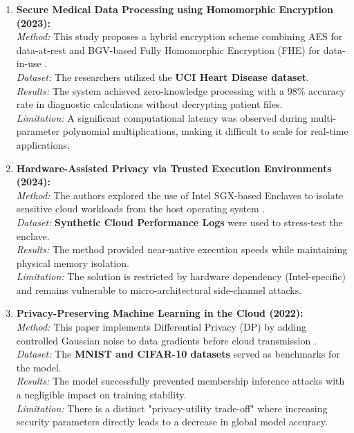 \documentclass[12pt, a4paper]{article}
\begin{document}
\begin{enumerate}
    \item \textbf{Secure Medical Data Processing using Homomorphic Encryption (2023):} \\
    \textit{Method:} This study proposes a hybrid encryption scheme combining AES for data-at-rest and BGV-based Fully Homomorphic Encryption (FHE) for data-in-use \cite{zhang2023cloudsecurity}. \\
    \textit{Dataset:} The researchers utilized the \textbf{UCI Heart Disease dataset}. \\
    \textit{Results:} The system achieved zero-knowledge processing with a 98\% accuracy rate in diagnostic calculations without decrypting patient files. \\
    \textit{Limitation:} A significant computational latency was observed during multi-parameter polynomial multiplications, making it difficult to scale for real-time applications.

    \item \textbf{Hardware-Assisted Privacy via Trusted Execution Environments (2024):} \\
    \textit{Method:} The authors explored the use of Intel SGX-based Enclaves to isolate sensitive cloud workloads from the host operating system \cite{bhushan2022cloudsecurity}. \\
    \textit{Dataset:} \textbf{Synthetic Cloud Performance Logs} were used to stress-test the enclave. \\
    \textit{Results:} The method provided near-native execution speeds while maintaining physical memory isolation. \\
    \textit{Limitation:} The solution is restricted by hardware dependency (Intel-specific) and remains vulnerable to micro-architectural side-channel attacks.

    \item \textbf{Privacy-Preserving Machine Learning in the Cloud (2022):} \\
    \textit{Method:} This paper implements Differential Privacy (DP) by adding controlled Gaussian noise to data gradients before cloud transmission \cite{li2023aisecurity}. \\
    \textit{Dataset:} The \textbf{MNIST and CIFAR-10 datasets} served as benchmarks for the model. \\
    \textit{Results:} The model successfully prevented membership inference attacks with a negligible impact on training stability. \\
    \textit{Limitation:} There is a distinct "privacy-utility trade-off" where increasing security parameters directly leads to a decrease in global model accuracy.


\end{enumerate}
\end{document}
